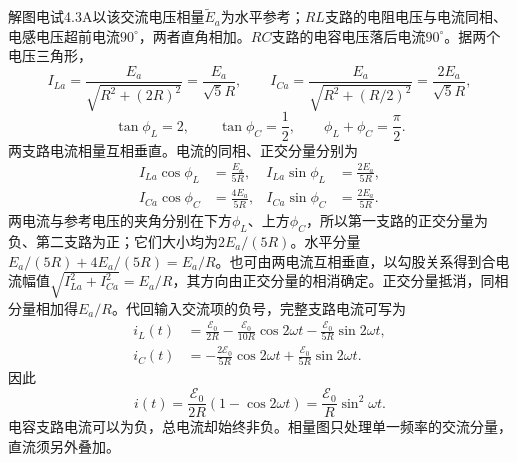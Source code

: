 \documentclass[UTF8,fontset=fandol,a4paper,11pt]{ctexart}
\begin{document}
解图电试4.3A以该交流电压相量$\widetilde E_a$为水平参考；$RL$支路的电阻电压与电流同相、电感电压超前电流$90^\circ$，两者直角相加。$RC$支路的电容电压落后电流$90^\circ$。据两个电压三角形，
\[
I_{La}=\frac{E_a}{\sqrt{R^2+(2R)^2}}
=\frac{E_a}{\sqrt5R},\qquad
I_{Ca}=\frac{E_a}{\sqrt{R^2+(R/2)^2}}
=\frac{2E_a}{\sqrt5R},
\]
\[
\tan\phi_L=2,\qquad \tan\phi_C=\frac12,\qquad
\phi_L+\phi_C=\frac\pi2.
\]
两支路电流相量互相垂直。电流的同相、正交分量分别为
\[
\begin{aligned}
I_{La}\cos\phi_L&=\frac{E_a}{5R},&
I_{La}\sin\phi_L&=\frac{2E_a}{5R},\\
I_{Ca}\cos\phi_C&=\frac{4E_a}{5R},&
I_{Ca}\sin\phi_C&=\frac{2E_a}{5R}.
\end{aligned}
\]
两电流与参考电压的夹角分别在下方$\phi_L$、上方$\phi_C$，所以第一支路的正交分量为负、第二支路为正；它们大小均为$2E_a/(5R)$。水平分量$E_a/(5R)+4E_a/(5R)=E_a/R$。也可由两电流互相垂直，以勾股关系得到合电流幅值$\sqrt{I_{La}^2+I_{Ca}^2}=E_a/R$，其方向由正交分量的相消确定。正交分量抵消，同相分量相加得$E_a/R$。代回输入交流项的负号，完整支路电流可写为
\[
\begin{aligned}
i_L(t)&=\frac{\mathcal E_0}{2R}
-\frac{\mathcal E_0}{10R}\cos2\omega t
-\frac{\mathcal E_0}{5R}\sin2\omega t,\\
i_C(t)&=-\frac{2\mathcal E_0}{5R}\cos2\omega t
+\frac{\mathcal E_0}{5R}\sin2\omega t.
\end{aligned}
\]
因此
\[
\boxed{i(t)=\frac{\mathcal E_0}{2R}(1-\cos2\omega t)
=\frac{\mathcal E_0}{R}\sin^2\omega t}.
\]
电容支路电流可以为负，总电流却始终非负。相量图只处理单一频率的交流分量，直流须另外叠加。
\end{document}
